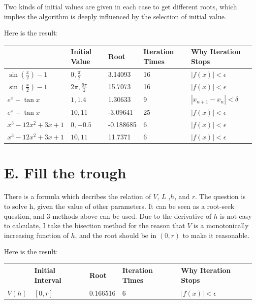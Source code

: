 \documentclass[a4paper]{article}
\begin{document}
Two kinds of initial values are given in each case to get different roots, which implies the algorithm is deeply influenced by the selection of initial value.

Here is the result:
\begin{table}[!ht]
    \centering
    \begin{tabular}{|l|l|l|l|l|}
    \hline
        ~ & Initial Value& Root & Iteration Times & Why Iteration Stops\\ \hline
        $\sin(\frac{x}{2}) - 1$ & $0,\frac{\pi}{2}$ & 3.14093 & 16 & $|f(x)| < \epsilon$ \\ \hline
        $\sin(\frac{x}{2}) - 1$ & $2\pi,\frac{9\pi}{2}$ & 15.7073 & 16 & $|f(x)| < \epsilon$ \\ \hline
        $e^{x} - \tan x$ & $1,1.4$ & 1.30633 & 9 & $|x_{n+1} - x_n| < \delta$ \\ \hline
        $e^{x} - \tan x$ & $10,11$ & -3.09641 & 25 & $|f(x)| < \epsilon$ \\ \hline
        $x^3 - 12x^2 + 3x + 1$ & $0,-0.5$ & -0.188685 & 6 & $|f(x)| < \epsilon$ \\ \hline
        $x^3 - 12x^2 + 3x + 1$ & $10,11$ & 11.7371 & 6 & $|f(x)| < \epsilon$ \\ \hline
    \end{tabular}
\end{table}

\section*{E. Fill the trough}

There is a formula which decribes the relation of $V$, $L$ ,$h$, and $r$. The question is to solve h, given the value of other parameters. It can be seen as a 
root-seek question, and 3 methods above can be used. Due to the derivative of $h$ is not easy to calculate, I take the bisection method for the reason that $V$ 
is a monotonically increasing function of $h$, and the root should be in $(0, r)$ to make it reasonable.

Here is the result:
\begin{table}[!ht]
    \centering
    \begin{tabular}{|l|l|l|l|l|}
    \hline
        ~ & Initial Interval& Root & Iteration Times & Why Iteration Stops\\ \hline
        $V(h)$ & $[0,r]$ & 0.166516 & 6 & $|f(x)| < \epsilon$ \\ \hline
    \end{tabular}
\end{table}
\end{document}
